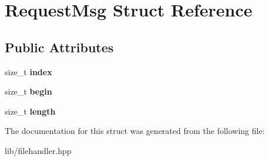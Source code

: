 \hypertarget{structRequestMsg}{}\section{Request\+Msg Struct Reference}
\label{structRequestMsg}
\subsection*{Public Attributes}
\begin{DoxyCompactItemize}
\item 
\mbox{\label{structRequestMsg_a7f20219554383b1ed60aed8acec7a287}} 
size\+\_\+t {\bfseries index}
\item 
\mbox{\label{structRequestMsg_a6197b604a388f266a963c3011114092c}} 
size\+\_\+t {\bfseries begin}
\item 
\mbox{\label{structRequestMsg_a764a4087dfa01afbf2eaedd31c4695f1}} 
size\+\_\+t {\bfseries length}
\end{DoxyCompactItemize}


The documentation for this struct was generated from the following file\+:\begin{DoxyCompactItemize}
\item 
lib/filehandler.\+hpp\end{DoxyCompactItemize}
